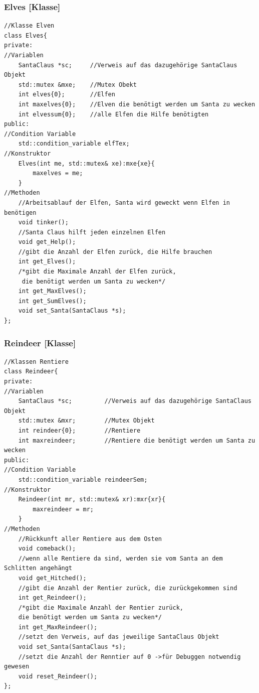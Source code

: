 \documentclass[a4paper,12pt]{exam}
\begin{document}
\subsubsection{Elves [Klasse]}
\begin{verbatim}
//Klasse Elven
class Elves{
private:
//Variablen
    SantaClaus *sc;     //Verweis auf das dazugehörige SantaClaus Objekt
    std::mutex &mxe;    //Mutex Obekt
    int elves{0};       //Elfen
    int maxelves{0};    //Elven die benötigt werden um Santa zu wecken
    int elvessum{0};    //alle Elfen die Hilfe benötigten 
public:
//Condition Variable
    std::condition_variable elfTex;
//Konstruktor
    Elves(int me, std::mutex& xe):mxe{xe}{
        maxelves = me;
    }
//Methoden
    //Arbeitsablauf der Elfen, Santa wird geweckt wenn Elfen in benötigen
    void tinker();
    //Santa Claus hilft jeden einzelnen Elfen
    void get_Help();
    //gibt die Anzahl der Elfen zurück, die Hilfe brauchen
    int get_Elves();
    /*gibt die Maximale Anzahl der Elfen zurück,
     die benötigt werden um Santa zu wecken*/
    int get_MaxElves();
    int get_SumElves();
    void set_Santa(SantaClaus *s);
};
\end{verbatim}
\newpage
\subsubsection{Reindeer [Klasse]}
\begin{verbatim}
//Klassen Rentiere
class Reindeer{
private:
//Variablen
    SantaClaus *sc;         //Verweis auf das dazugehörige SantaClaus Objekt
    std::mutex &mxr;        //Mutex Objekt
    int reindeer{0};        //Rentiere
    int maxreindeer;        //Rentiere die benötigt werden um Santa zu wecken
public:
//Condition Variable
    std::condition_variable reindeerSem;
//Konstruktor
    Reindeer(int mr, std::mutex& xr):mxr{xr}{
        maxreindeer = mr;
    }    
//Methoden
    //Rückkunft aller Rentiere aus dem Osten
    void comeback();
    //wenn alle Rentiere da sind, werden sie vom Santa an dem Schlitten angehängt
    void get_Hitched();
    //gibt die Anzahl der Rentier zurück, die zurückgekommen sind
    int get_Reindeer();
    /*gibt die Maximale Anzahl der Rentier zurück, 
    die benötigt werden um Santa zu wecken*/
    int get_MaxReindeer();
    //setzt den Verweis, auf das jeweilige SantaClaus Objekt
    void set_Santa(SantaClaus *s);
    //setzt die Anzahl der Renntier auf 0 ->für Debuggen notwendig gewesen
    void reset_Reindeer();
};
\end{verbatim}
\newpage
\end{document}
